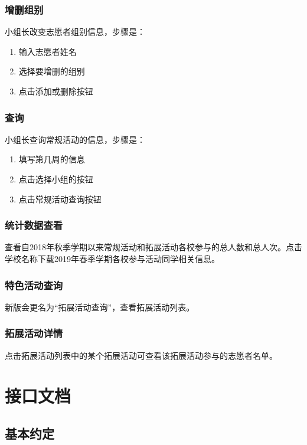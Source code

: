 \documentclass[]{ctexart}
\begin{document}
\subsubsection{增删组别}
小组长改变志愿者组别信息，步骤是：
\begin{enumerate}
\item 输入志愿者姓名
\item 选择要增删的组别
\item 点击添加或删除按钮
\end{enumerate}

\subsubsection{查询}
小组长查询常规活动的信息，步骤是：
\begin{enumerate}
\item 填写第几周的信息
\item 点击选择小组的按钮
\item 点击常规活动查询按钮
\end{enumerate}

\subsubsection{统计数据查看}
查看自2018年秋季学期以来常规活动和拓展活动各校参与的总人数和总人次。点击学校名称下载2019年春季学期各校参与活动同学相关信息。

\subsubsection{特色活动查询}
新版会更名为“拓展活动查询”，查看拓展活动列表。

\subsubsection{拓展活动详情}
点击拓展活动列表中的某个拓展活动可查看该拓展活动参与的志愿者名单。

\section{接口文档}\label{api}

\hypertarget{ux57faux672cux7ea6ux5b9a}{%
\subsection{基本约定}\label{ux57faux672cux7ea6ux5b9a}}
\end{document}
